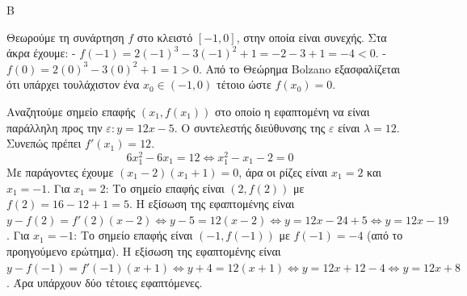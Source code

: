 \begin{thema}{Β}
\begin{erwthma}
\item Θεωρούμε τη συνάρτηση $f$ στο κλειστό $[-1, 0]$, στην οποία είναι συνεχής. Στα άκρα έχουμε:
- $f(-1) = 2(-1)^3 - 3(-1)^2 + 1 = -2 - 3 + 1 = -4 < 0$.
- $f(0) = 2(0)^3 - 3(0)^2 + 1 = 1 > 0$.
Από το Θεώρημα Bolzano εξασφαλίζεται ότι υπάρχει τουλάχιστον ένα $x_0 \in (-1, 0)$ τέτοιο ώστε $f(x_0)=0$.

\item Αναζητούμε σημείο επαφής $(x_1, f(x_1))$ στο οποίο η εφαπτομένη να είναι παράλληλη προς την $\varepsilon: y = 12x-5$. 
Ο συντελεστής διεύθυνσης της $\varepsilon$ είναι $\lambda = 12$. Συνεπώς πρέπει $f'(x_1) = 12$.
\[ 6x_1^2 - 6x_1 = 12 \Leftrightarrow x_1^2 - x_1 - 2 = 0 \]
Με παράγοντες έχουμε $(x_1 - 2)(x_1 + 1) = 0$, άρα οι ρίζες είναι $x_1 = 2$ και $x_1 = -1$.
Για $x_1 = 2$: Το σημείο επαφής είναι $(2, f(2))$ με $f(2) = 16 - 12 + 1 = 5$.
Η εξίσωση της εφαπτομένης είναι $y - f(2) = f'(2)(x-2) \Leftrightarrow y - 5 = 12(x-2) \Leftrightarrow y = 12x - 24 + 5 \Leftrightarrow y = 12x - 19$.
Για $x_1 = -1$: Το σημείο επαφής είναι $(-1, f(-1))$ με $f(-1) = -4$ (από το προηγούμενο ερώτημα).
Η εξίσωση της εφαπτομένης είναι $y - f(-1) = f'(-1)(x+1) \Leftrightarrow y + 4 = 12(x+1) \Leftrightarrow y = 12x + 12 - 4 \Leftrightarrow y = 12x + 8$.
Άρα υπάρχουν δύο τέτοιες εφαπτόμενες.
\end{erwthma}
\end{thema}

